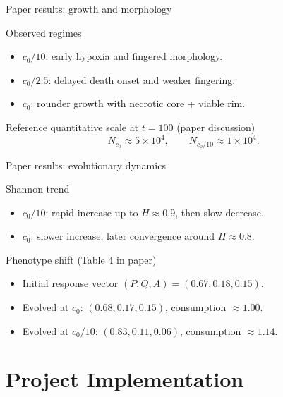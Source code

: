 \documentclass[10pt,aspectratio=169]{beamer}
\begin{document}
\begin{frame}[c]{Paper results: growth and morphology}
\begin{block}{Observed regimes}
\begin{itemize}
  \item $c_0/10$: early hypoxia and fingered morphology.
  \item $c_0/2.5$: delayed death onset and weaker fingering.
  \item $c_0$: rounder growth with necrotic core + viable rim.
\end{itemize}
\end{block}

\begin{exampleblock}{Reference quantitative scale at $t=100$ (paper discussion)}
\[
N_{c_0}\approx 5\times 10^4,
\qquad
N_{c_0/10}\approx 1\times 10^4.
\]
\end{exampleblock}
\end{frame}

\begin{frame}[c]{Paper results: evolutionary dynamics}
\begin{block}{Shannon trend}
\begin{itemize}
  \item $c_0/10$: rapid increase up to $H\approx 0.9$, then slow decrease.
  \item $c_0$: slower increase, later convergence around $H\approx 0.8$.
\end{itemize}
\end{block}

\begin{block}{Phenotype shift (Table 4 in paper)}
\begin{itemize}
  \item Initial response vector $(P,Q,A)=(0.67,0.18,0.15)$.
  \item Evolved at $c_0$: $(0.68,0.17,0.15)$, consumption $\approx 1.00$.
  \item Evolved at $c_0/10$: $(0.83,0.11,0.06)$, consumption $\approx 1.14$.
\end{itemize}
\end{block}
\end{frame}

\section{Project Implementation}
\end{document}
